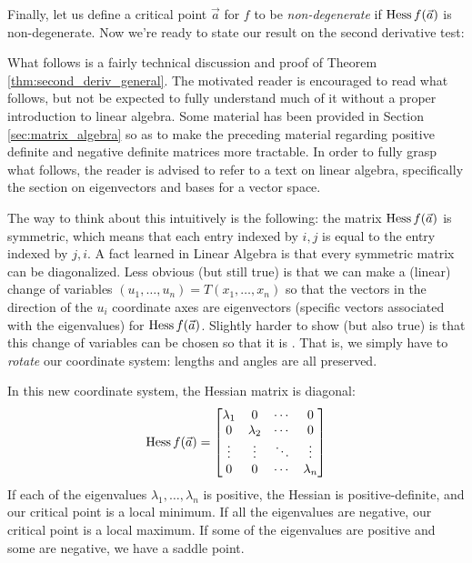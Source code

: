 Finally, let us define a critical point $\vec{a}$ for $f$ to be {\em non-degenerate} if $\operatorname{Hess} f(\vec{a})$ is non-degenerate.  Now we're ready to state our result on the second derivative test:

What follows is a fairly technical discussion and proof of Theorem \ref{thm:second_deriv_general}.  The motivated reader is encouraged to read what follows, but not be expected to fully understand much of it without a proper introduction to linear algebra.  Some material has been provided in Section \ref{sec:matrix_algebra} so as to make the preceding material regarding positive definite and negative definite matrices more tractable.  In order to fully grasp what follows, the reader is advised to refer to a text on linear algebra, specifically the section on eigenvectors and bases for a vector space.  
 
The way to think about this intuitively is the following: the matrix $\operatorname{Hess} f(\vec{a})$ is symmetric, which means that each entry indexed by $i,j$ is equal to the entry indexed by $j,i$. A fact learned in Linear Algebra is that every symmetric matrix can be diagonalized. Less obvious (but still true) is that we can make a (linear) change of variables $(u_1,\ldots, u_n) = T(x_1,\ldots, x_n)$ so that the vectors in the direction of the $u_i$ coordinate axes are eigenvectors (specific vectors associated with the eigenvalues) for $\operatorname{Hess} f(\vec{a})$. Slightly harder to show (but also true) is that this change of variables can be chosen so that it is . That is, we simply have to \emph{rotate} our coordinate system: lengths and angles are all preserved.

In this new coordinate system, the Hessian matrix is diagonal:
\[
\operatorname{Hess} f(\vec{a}) = \begin{bmatrix} \lambda_1 & 0 & \cdots & 0\\
								  0 & \lambda_2 & \cdots & 0\\
								  \vdots & \vdots & \ddots & \vdots\\
								  0 & 0 & \cdots & \lambda_n\end{bmatrix}
\]
If each of the eigenvalues $\lambda_1,\ldots, \lambda_n$ is positive, the Hessian is positive-definite, and our critical point is a local minimum. If all the eigenvalues are negative, our critical point is a local maximum. If some of the eigenvalues are positive and some are negative, we have a saddle point.

